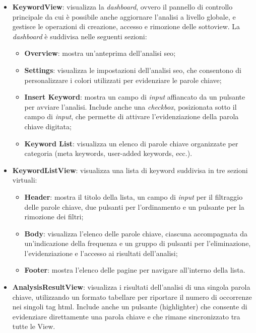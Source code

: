 \begin{itemize}
  \item \textbf{KeywordView}: visualizza la \textit{dashboard}, ovvero il pannello di controllo principale da cui è possibile anche aggiornare l’analisi a livello globale, e gestisce le operazioni di creazione, accesso e rimozione delle sottoview. La \textit{dashboard} è suddivisa nelle seguenti sezioni:
  \begin{itemize}
    \item \textbf{Overview}: mostra un’anteprima dell’analisi \gls{seo};
    \item \textbf{Settings}: visualizza le impostazioni dell’analisi \gls{seo}, che consentono di personalizzare i colori utilizzati per evidenziare le parole chiave;
    \item \textbf{Insert Keyword}: mostra un campo di \textit{input} affiancato da un pulsante per avviare l’analisi. Include anche una \textit{checkbox}, posizionata sotto il campo di \textit{input}, che permette di attivare l’evidenziazione della parola chiave digitata;
    \item \textbf{Keyword List}: visualizza un elenco di parole chiave organizzate per categoria (meta keywords, user-added keywords, ecc.).
  \end{itemize}
  \item \textbf{KeywordListView}: visualizza una lista di keyword suddivisa in tre sezioni virtuali:
  \begin{itemize}
    \item \textbf{Header}: mostra il titolo della lista, un campo di \textit{input} per il filtraggio delle parole chiave, due pulsanti per l’ordinamento e un pulsante per la rimozione dei filtri;
    \item \textbf{Body}: visualizza l’elenco delle parole chiave, ciascuna accompagnata da un’indicazione della frequenza e un gruppo di pulsanti per l’eliminazione, l’evidenziazione e l’accesso ai risultati dell’analisi;
    \item \textbf{Footer}: mostra l’elenco delle pagine per navigare all’interno della lista.
  \end{itemize}
  \item \textbf{AnalysisResultView}: visualizza i risultati dell’analisi di una singola parola chiave, utilizzando un formato tabellare per riportare il numero di occorrenze nei singoli tag \gls{html}. Include anche un pulsante (highlighter) che consente di evidenziare direttamente una parola chiave e che rimane sincronizzato tra tutte le View.
\end{itemize}

